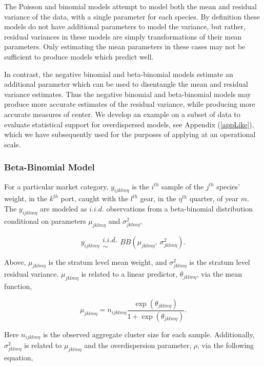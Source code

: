 \documentclass[12pt]{article}
\begin{document}
The Poisson and binomial models attempt to model both the mean and
residual variance of the data, with a single parameter for each species.
By definition these models do not have additional parameters to model
the variance, but rather, residual variances in these models are simply
transformations of their mean parameters. Only estimating the mean
parameters in these cases may not be sufficient to produce models which
predict well.

In contrast, the negative binomial and beta-binomial models estimate an
additional parameter which can be used to disentangle the mean and
residual variance estimates. Thus the negative binomial and
beta-binomial models may produce more accurate estimates of the residual
variance, while producing more accurate measures of center. We develop
an example on a subset of data to evaluate statistical support for 
overdispersed models, see Appendix (\ref{appLike}), which we have 
subsequently used for the purposes of applying at an operational scale.

\subsubsection{Beta-Binomial Model}\label{bbModel}

For a particular market category, \(y_{ijklm\eta}\) is the \(i^{th}\)
sample of the \(j^{th}\) species' weight, in the \(k^{th}\) port, caught
with the \(l^{th}\) gear, in the \(\eta^{th}\) quarter, of year \(m\).
The \(y_{ijklm\eta}\) are modeled as $i.i.d.$ observations from a beta-binomial 
distribution conditional on parameters \(\mu_{jklm\eta}\) and 
\(\sigma^2_{jklm\eta}\),

\[y_{ijklm\eta} \substack{i.i.d.\\\sim} BB(\mu_{jklm\eta},~\sigma^2_{jklm\eta}).\]

Above, \(\mu_{jklm\eta}\) is the stratum level mean weight, and
\(\sigma^2_{jklm\eta}\) is the stratum level residual variance.
\(\mu_{jklm\eta}\) is related to a linear predictor,
\(\theta_{jklm\eta}\), via the mean function,

\[\mu_{jklm\eta} = n_{ijklm\eta}\frac{\exp(\theta_{jklm\eta})}{1+\exp(\theta_{jklm\eta})}.\]%

Here \(n_{ijklm\eta}\) is the observed aggregate cluster size for each
sample. Additionally, \(\sigma^2_{jklm\eta}\) is related to
\(\mu_{jklm\eta}\) and the overdispersion parameter, \(\rho\), via the
following equation,
\end{document}
